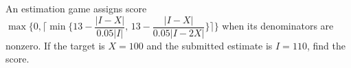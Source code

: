 An estimation game assigns score $\max\{0,\lceil\min\{13-\dfrac{|I-X|}{0.05|I|},\,13-\dfrac{|I-X|}{0.05|I-2X|}\}\rceil\}$ when its denominators are nonzero. If the target is $X=100$ and the submitted estimate is $I=110$, find the score.
